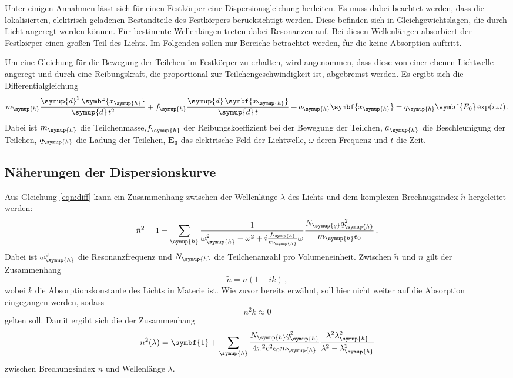 Unter einigen Annahmen lässt sich für einen Festkörper eine Dispersionsgleichung
herleiten. Es muss dabei beachtet werden, dass die lokalisierten, elektrisch geladenen
Bestandteile des Festkörpers berücksichtigt werden. Diese befinden sich in Gleichgewichtslagen,
die durch Licht angeregt werden können. Für bestimmte Wellenlängen treten dabei
Resonanzen auf. Bei diesen Wellenlängen absorbiert der Festkörper einen großen Teil
des Lichts. Im Folgenden sollen nur Bereiche betrachtet werden, für die keine
Absorption auftritt.

Um eine Gleichung für die Bewegung der Teilchen im Festkörper zu erhalten, wird
angenommen, dass diese von einer ebenen Lichtwelle angeregt und durch eine Reibungskraft,
die proportional zur Teilchengeschwindigkeit ist, abgebremst werden. Es ergibt sich
die Differentialgleichung
\begin{equation}
  m_{\symup{h}}\frac{\symup{d}^2\,\symbf{x_{\symup{h}}}}{\symup{d}\,t^2}
  +f_{\symup{h}}\frac{\symup{d}\,\symbf{x_{\symup{h}}}}{\symup{d}\,t}
  +a_{\symup{h}}\symbf{x_{\symup{h}}}=q_{\symup{h}}\symbf{E_0}\exp(i \omega t)\,.
  \label{eqn:diff}
\end{equation}
Dabei ist $m_{\symup{h}}$ die Teilchenmasse,$f_{\symup{h}}$ der Reibungskoeffizient
bei der Bewegung der Teilchen, $a_{\symup{h}}$ die Beschleunigung der Teilchen,
$q_{\symup{h}}$ die Ladung der Teilchen, $\symbf{E_0}$ das elektrische Feld der Lichtwelle,
$\omega$ deren Frequenz und $t$ die Zeit.

\subsection{Näherungen der Dispersionskurve}
\label{subsec:dispersion2}

Aus Gleichung \eqref{eqn:diff} kann ein Zusammenhang zwischen der Wellenlänge $\lambda$ des
Lichts und dem komplexen Brechnugsindex $\tilde{n}$ hergeleitet werden:
\begin{equation}
  \tilde{n}^2=1+\sum_{\symup{h}}\frac{1}{\omega_{\symup{h}}^2-\omega^2
  +i\frac{f_{\symup{h}}}{m_{\symup{h}}}\omega} \frac{N_{\symup{q}} q_{\symup{h}}^2}
  {m_{\symup{h}} \epsilon_0} \,.
\end{equation}
Dabei ist $\omega_{\symup{h}}^2$ die Resonanzfrequenz und $N_{\symup{h}}$ die
Teilchenanzahl pro Volumeneinheit. Zwischen $\tilde{n}$ und $n$ gilt der Zusammenhang
\begin{equation}
  \tilde{n}=n(1-ik)\,,
\end{equation}
wobei $k$ die Absorptionskonstante des Lichts in Materie ist. Wie zuvor bereits erwähnt,
soll hier nicht weiter auf die Absorption eingegangen werden, sodass
\begin{equation}
  n^2k\approx0
\end{equation}
gelten soll. Damit ergibt sich die der Zusammenhang
\begin{equation}
  {n}^2 (\lambda) = \symbf{1}+\sum_{\symup{h}} \frac{N_{\symup{h}}q_{\symup{h}}^2}
  {4 \pi^2 c^2 \epsilon_0 m_{\symup{h}}}
  \frac{\lambda^2 \lambda_{\symup{h}}^2}{\lambda^2-\lambda_{\symup{h}}^2}
  \label{eqn:dispersion}
\end{equation}
zwischen Brechungsindex $n$ und Wellenlänge $\lambda$.


